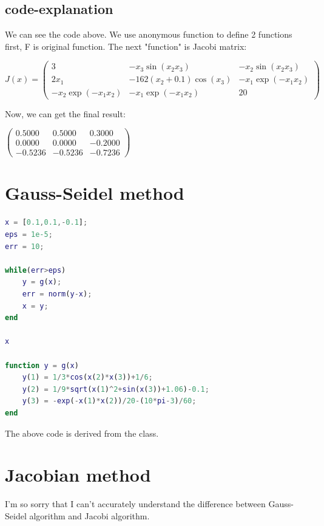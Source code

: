 \documentclass[12pt, a4paper, oneside]{ctexart}
\begin{document}
\begin{spacing}{2.0}
\subsection{code-explanation}
We can see the code above. We use anonymous function to define 2 functions first, F is original function. 
The next "function" is Jacobi matrix:
\begin{center}
    $J(x) = \begin{pmatrix}
        3 & -x_{3}\sin{(x_{2}x_{3})} & -x_{2}\sin{(x_{2}x_{3})} \\
        2x_{1} & -162(x_{2} + 0.1)\cos(x_{3}) & -x_{1}\exp{(-x_{1}x_{2})} \\
        -x_{2}\exp{(-x_{1}x_{2})} & -x_{1}\exp{(-x_{1}x_{2})} & 20
        \end{pmatrix}
        $
\end{center}
Now, we can get the final result:
\begin{center}
$    \begin{pmatrix}
        0.5000 & 0.5000 & 0.3000 \\
        0.0000 & 0.0000 & -0.2000 \\
        -0.5236 & -0.5236 & -0.7236
        \end{pmatrix}
$        
\end{center}


\section{Gauss-Seidel method}

\begin{lstlisting}[language=Matlab, caption=Newton-Raphson method]
x = [0.1,0.1,-0.1];
eps = 1e-5;
err = 10;

while(err>eps)
    y = g(x);
    err = norm(y-x);
    x = y;
end

x

function y = g(x)
    y(1) = 1/3*cos(x(2)*x(3))+1/6;
    y(2) = 1/9*sqrt(x(1)^2+sin(x(3))+1.06)-0.1;
    y(3) = -exp(-x(1)*x(2))/20-(10*pi-3)/60;
end

\end{lstlisting}

The above code is derived from the class.


\section{Jacobian method}
I'm so sorry that I can't accurately understand the difference between Gauss-Seidel algorithm and Jacobi algorithm.

\end{spacing}
\end{document}
